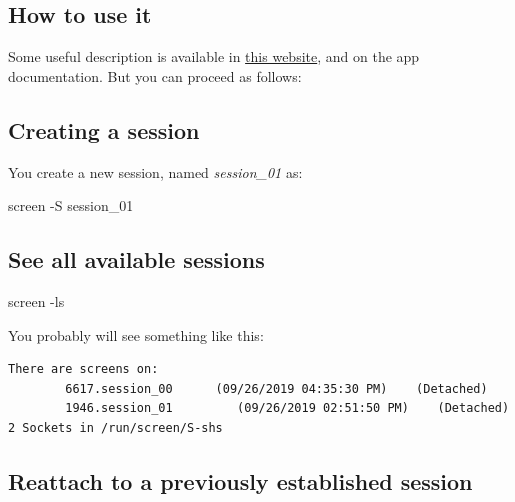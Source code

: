 \documentclass[
]{book}
\newenvironment{Shaded}{\begin{snugshade}}{\end{snugshade}}
\newcommand{\AttributeTok}[1]{\textcolor[rgb]{0.13,0.29,0.53}{#1}}
\newcommand{\ExtensionTok}[1]{#1}
\newcommand{\NormalTok}[1]{#1}
\begin{document}
\hypertarget{how-to-use-it}{%
\subsection{How to use it}\label{how-to-use-it}}

Some useful description is available in \href{https://web.archive.org/web/20230606181644/https://www.networkworld.com/article/3441777/how-the-linux-screen-tool-can-save-your-tasks-and-your-sanity-if-ssh-is-interrupted.html}{this website}, and on the app documentation. But you can proceed as follows:

\hypertarget{creating-a-session}{%
\subsection{Creating a session}\label{creating-a-session}}

You create a new session, named \emph{session\_01} as:

\begin{Shaded}
\begin{Highlighting}[]
\ExtensionTok{screen} \AttributeTok{{-}S}\NormalTok{ session\_01}
\end{Highlighting}
\end{Shaded}

\hypertarget{see-all-available-sessions}{%
\subsection{See all available sessions}\label{see-all-available-sessions}}

\begin{Shaded}
\begin{Highlighting}[]
\ExtensionTok{screen} \AttributeTok{{-}ls}
\end{Highlighting}
\end{Shaded}

You probably will see something like this:

\begin{verbatim}
There are screens on:
        6617.session_00      (09/26/2019 04:35:30 PM)    (Detached)
        1946.session_01         (09/26/2019 02:51:50 PM)    (Detached)
2 Sockets in /run/screen/S-shs
\end{verbatim}

\hypertarget{reattach-to-a-previously-established-session}{%
\subsection{Reattach to a previously established session}\label{reattach-to-a-previously-established-session}}
\end{document}
